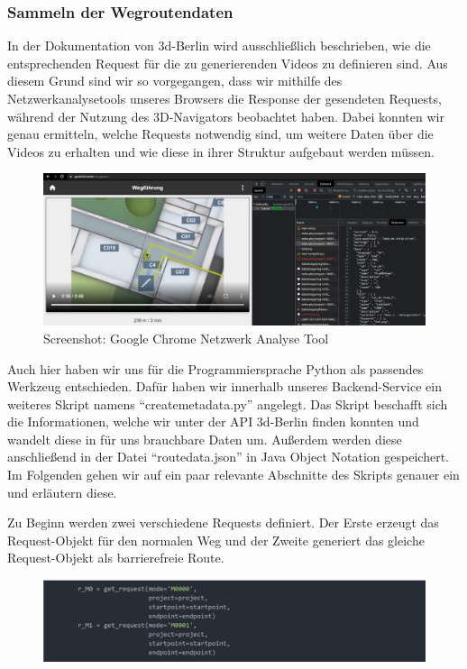 \subsubsection{Sammeln der Wegroutendaten}

In der Dokumentation von 3d-Berlin wird ausschließlich beschrieben, wie die entsprechenden Request für die zu generierenden Videos zu definieren sind. Aus diesem Grund sind wir so vorgegangen, dass wir mithilfe des Netzwerkanalysetools unseres Browsers die Response der gesendeten Requests, während der Nutzung des 3D-Navigators beobachtet haben. Dabei konnten wir genau ermitteln, welche Requests notwendig sind, um weitere Daten über die Videos zu erhalten und wie diese in ihrer Struktur aufgebaut werden müssen.

\begin{figure}[H]
    \includegraphics[width=\textwidth]{Figures/3DNavigator/analysetool.png}
    \caption{Screenshot: Google Chrome Netzwerk Analyse Tool}
    \label{fig:integration}
    \centering
\end{figure}

Auch hier haben wir uns für die Programmiersprache Python als passendes Werkzeug entschieden. Dafür haben wir innerhalb unseres Backend-Service ein weiteres Skript namens “createmetadata.py” angelegt. Das Skript beschafft sich die Informationen, welche wir unter der API 3d-Berlin finden konnten und wandelt diese in für uns brauchbare Daten um. Außerdem werden diese anschließend in der Datei “routedata.json” in Java Object Notation gespeichert. Im Folgenden gehen wir auf ein paar relevante Abschnitte des Skripts genauer ein und erläutern diese.

Zu Beginn werden zwei verschiedene Requests definiert. Der Erste erzeugt das Request-Objekt für den normalen Weg und der Zweite generiert das gleiche Request-Objekt als barrierefreie Route.

\begin{figure}[H]
    \includegraphics[width=\textwidth]{Figures/3DNavigator/code05.jpg}
    \centering
\end{figure} \vspace{-3.5mm}

